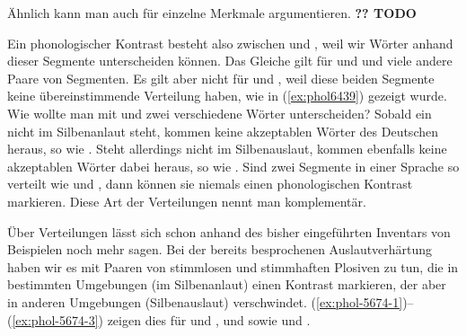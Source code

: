 Ähnlich kann man auch für einzelne Merkmale argumentieren.
\textbf{?? TODO}


Ein phonologischer Kontrast besteht also \zB zwischen \textipa{[t]} und \textipa{[k]}, weil wir Wörter anhand dieser Segmente unterscheiden können.
Das Gleiche gilt für \textipa{[s]} und \textipa{[z]} und viele andere Paare von Segmenten.
Es gilt aber nicht für \textipa{[h]} und \textipa{[N]}, weil diese beiden Segmente keine übereinstimmende Verteilung haben, wie in (\ref{ex:phol6439}) gezeigt wurde.
Wie wollte man mit \textipa{[h]} und \textipa{[N]} zwei verschiedene Wörter unterscheiden?
Sobald ein \textipa{[h]} nicht im Silbenanlaut steht, kommen keine akzeptablen Wörter des Deutschen heraus, so wie \textipa{[SVUh]}.
Steht allerdings \textipa{[N]} nicht im Silbenauslaut, kommen ebenfalls keine akzeptablen Wörter dabei heraus, so wie \textipa{[Nand]}.
Sind zwei Segmente in einer Sprache so verteilt wie \textipa{[h]} und \textipa{[N]}, dann können sie niemals einen phonologischen Kontrast markieren.
Diese Art der Verteilungen nennt man komplementär.


Über Verteilungen lässt sich schon anhand des bisher eingeführten Inventars von Beispielen noch mehr sagen.
Bei der bereits besprochenen Auslautverhärtung haben wir es mit Paaren von stimmlosen und stimmhaften Plosiven zu tun, die in bestimmten Umgebungen (im Silbenanlaut) einen Kontrast markieren, der aber in anderen Umgebungen (Silbenauslaut) verschwindet.
(\ref{ex:phol-5674-1})--(\ref{ex:phol-5674-3}) zeigen dies für \textipa{[g]} und \textipa{[k]}, \textipa{[d]} und \textipa{[t]} sowie \textipa{[b]} und \textipa{[p]}.

\begin{exe}
  \ex\label{ex:phol-5674-1}
  \begin{xlist}
  \end{xlist}
  \ex\label{ex:phol-5674-2}
  \begin{xlist}
  \end{xlist}
  \ex\label{ex:phol-5674-3}
  \begin{xlist}
  \end{xlist}
\end{exe}

